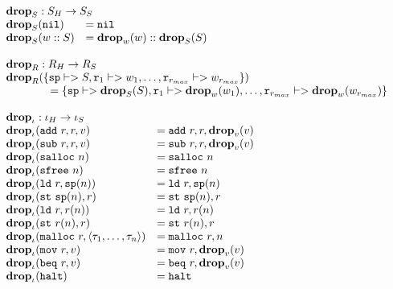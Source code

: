 {\[\begin{array}{l}
\begin{array}{ll}
\rlap{$\drop{S} : \high S -> \simple{S}$} \\
\drop{S}(\mathtt{nil}) &= \mathtt{nil} \\
\drop{S}(w :: S) &= \drop{w}(w) :: \drop{S}(S) \\
\end{array} \\\\

\begin{array}{l}
\drop{R} : \high R -> \simple{R} \\
\drop{R}(\{\mathtt{sp} |-> S, \mathtt{r}_1 |-> w_1, \dots, \mathtt{r}_{r_{max}} |-> w_{r_{max}}\})\\
\quad\quad\quad\quad = \{\mathtt{sp} |-> \drop{S}(S), \mathtt{r}_1 |-> \drop{w}(w_1), \dots, \mathtt{r}_{r_{max}} |-> \drop{w}(w_{r_{max}})\}
\end{array} \\\\

\begin{array}{ll}
\rlap{$\drop{\iota} : \high\iota -> \simple\iota$} \\
\drop{\iota}(\mathtt{add}\ r, r, v) &= \mathtt{add}\ r, r, \drop{v}(v) \\
\drop{\iota}(\mathtt{sub}\ r, r, v) &= \mathtt{sub}\ r, r, \drop{v}(v) \\
\drop{\iota}(\mathtt{salloc}\ n) &= \mathtt{salloc}\ n \\
\drop{\iota}(\mathtt{sfree}\ n) &= \mathtt{sfree}\ n \\
\drop{\iota}(\mathtt{ld}\ r, \mathtt{sp}(n)) &= \mathtt{ld}\ r, \mathtt{sp}(n) \\
\drop{\iota}(\mathtt{st}\ \mathtt{sp}(n), r) &= \mathtt{st}\ \mathtt{sp}(n), r \\
\drop{\iota}(\mathtt{ld}\ r, r(n)) &= \mathtt{ld}\ r, r(n) \\
\drop{\iota}(\mathtt{st}\ r(n), r) &= \mathtt{st}\ r(n), r \\
\drop{\iota}(\mathtt{malloc}\ r, \langle \tau_1, \dots, \tau_n \rangle) &= \mathtt{malloc}\ r, n \\
\drop{\iota}(\mathtt{mov}\ r, v) &= \mathtt{mov}\ r, \drop{v}(v) \\
\drop{\iota}(\mathtt{beq}\ r, v) &= \mathtt{beq}\ r, \drop{v}(v) \\
\drop{\iota}(\mathtt{halt}) &= \mathtt{halt} \\
\end{array} \\\\


\end{array}\]}
